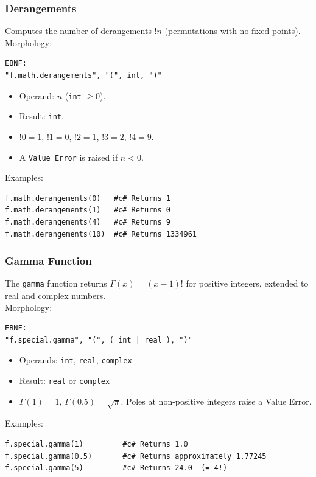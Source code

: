 \subsubsection{Derangements}
Computes the number of derangements $!n$ (permutations with no fixed points). \\
Morphology:
\begin{verbatim}
EBNF:
"f.math.derangements", "(", int, ")"
\end{verbatim}
\begin{itemize}
\item Operand: $n$ (\texttt{int} $\geq 0$).
\item Result: \texttt{int}.
\item $!0 = 1$, $!1 = 0$, $!2 = 1$, $!3 = 2$, $!4 = 9$.
\item A \texttt{Value Error} is raised if $n < 0$.
\end{itemize}
Examples:
\begin{verbatim}
f.math.derangements(0)   #c# Returns 1
f.math.derangements(1)   #c# Returns 0
f.math.derangements(4)   #c# Returns 9
f.math.derangements(10)  #c# Returns 1334961
\end{verbatim}

\subsubsection{Gamma Function}
The \texttt{gamma} function returns $\Gamma(x) = (x-1)!$ for positive integers, extended to real and complex numbers.\\
Morphology:
\begin{verbatim}
EBNF:
"f.special.gamma", "(", ( int | real ), ")"
\end{verbatim}
\begin{itemize}
\item Operands: \texttt{int}, \texttt{real}, \texttt{complex}
\item Result: \texttt{real} or \texttt{complex}
\item $\Gamma(1) = 1$, $\Gamma(0.5) = \sqrt{\pi}$. Poles at non-positive integers raise a Value Error.
\end{itemize}
Examples:
\begin{verbatim}
f.special.gamma(1)         #c# Returns 1.0
f.special.gamma(0.5)       #c# Returns approximately 1.77245
f.special.gamma(5)         #c# Returns 24.0  (= 4!)
\end{verbatim}

